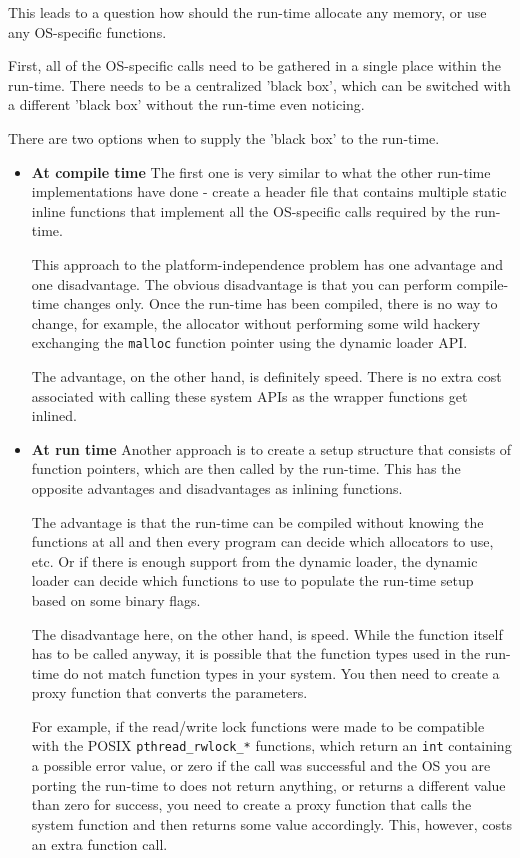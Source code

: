 This leads to a question how should the run-time allocate any memory, or use any OS-specific functions.

First, all of the OS-specific calls need to be gathered in a single place within the run-time. There needs to be a centralized 'black box', which can be switched with a different 'black box' without the run-time even noticing.

There are two options when to supply the 'black box' to the run-time.

\begin{itemize}
\item{\bf{At compile time}}
The first one is very similar to what the other run-time implementations have done - create a header file that contains multiple static inline functions that implement all the OS-specific calls required by the run-time.

This approach to the platform-independence problem has one advantage and one disadvantage. The obvious disadvantage is that you can perform compile-time changes only. Once the run-time has been compiled, there is no way to change, for example, the allocator without performing some wild hackery exchanging the \verb=malloc= function pointer using the dynamic loader API.

The advantage, on the other hand, is definitely speed. There is no extra cost associated with calling these system APIs as the wrapper functions get inlined.

\item{\bf{At run time}}
Another approach is to create a setup structure that consists of function pointers, which are then called by the run-time. This has the opposite advantages and disadvantages as inlining functions.

The advantage is that the run-time can be compiled without knowing the functions at all and then every program can decide which allocators to use, etc. Or if there is enough support from the dynamic loader, the dynamic loader can decide which functions to use to populate the run-time setup based on some binary flags.

The disadvantage here, on the other hand, is speed. While the function itself has to be called anyway, it is possible that the function types used in the run-time do not match function types in your system. You then need to create a proxy function that converts the parameters.

For example, if the read/write lock functions were made to be compatible with the POSIX \verb=pthread_rwlock_*= functions, which return an \verb=int= containing a possible error value, or zero if the call was successful and the OS you are porting the run-time to does not return anything, or returns a different value than zero for success, you need to create a proxy function that calls the system function and then returns some value accordingly. This, however, costs an extra function call.
\end{itemize}

